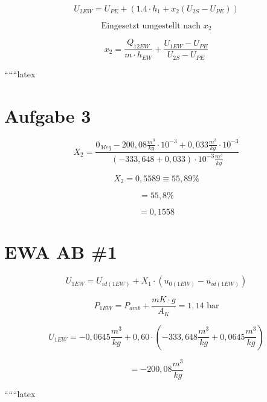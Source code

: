 \[
U_{2EW} = U_{PE} + (1.4 \cdot h_1 + x_2 (U_{2S} - U_{PE}))
\]

\[
\text{Eingesetzt umgestellt nach } x_2
\]

\[
x_2 = \frac{Q_{12EW}}{m \cdot h_{EW}} + \frac{U_{1EW} - U_{PE}}{U_{2S} - U_{PE}}
\]

``````latex


\section*{Aufgabe 3}

\[
X_2 = \frac{0_{Meq} - 200,08 \frac{m^3}{kg} \cdot 10^{-3} + 0,033 \frac{m^3}{kg} \cdot 10^{-3}}{(-333,648 + 0,033) \cdot 10^{-3} \frac{m^3}{kg}}
\]

\[
X_2 = 0,5589 \equiv 55,89\%
\]

\[
= 55,8\%
\]

\[
= 0,1558
\]

\section*{EWA AB \#1}

\[
U_{1EW} = U_{id(1EW)} + X_1 \cdot (u_{0(1EW)} - u_{id(1EW)})
\]

\[
P_{1EW} = P_{amb} + \frac{mK \cdot g}{A_K} = 1,14 \text{ bar}
\]

\[
U_{1EW} = -0,0645 \frac{m^3}{kg} + 0,60 \cdot (-333,648 \frac{m^3}{kg} + 0,0645 \frac{m^3}{kg})
\]

\[
= -200,08 \frac{m^3}{kg}
\]

``````latex


